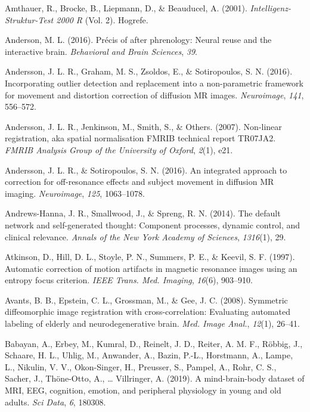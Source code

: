 \documentclass[12pt,american,a4paper,oneside,]{memoir} %
\begin{document}
\leavevmode\hypertarget{ref-Amthauer2001-yg}{}%
Amthauer, R., Brocke, B., Liepmann, D., \& Beauducel, A. (2001). \emph{Intelligenz-Struktur-Test 2000 R} (Vol. 2). Hogrefe.

\leavevmode\hypertarget{ref-anderson2016precis}{}%
Anderson, M. L. (2016). Précis of after phrenology: Neural reuse and the interactive brain. \emph{Behavioral and Brain Sciences}, \emph{39}.

\leavevmode\hypertarget{ref-Andersson2016-nm}{}%
Andersson, J. L. R., Graham, M. S., Zsoldos, E., \& Sotiropoulos, S. N. (2016). Incorporating outlier detection and replacement into a non-parametric framework for movement and distortion correction of diffusion MR images. \emph{Neuroimage}, \emph{141}, 556--572.

\leavevmode\hypertarget{ref-Andersson2007-st}{}%
Andersson, J. L. R., Jenkinson, M., Smith, S., \& Others. (2007). Non-linear registration, aka spatial normalisation FMRIB technical report TR07JA2. \emph{FMRIB Analysis Group of the University of Oxford}, \emph{2}(1), e21.

\leavevmode\hypertarget{ref-Andersson2016-pg}{}%
Andersson, J. L. R., \& Sotiropoulos, S. N. (2016). An integrated approach to correction for off-resonance effects and subject movement in diffusion MR imaging. \emph{Neuroimage}, \emph{125}, 1063--1078.

\leavevmode\hypertarget{ref-andrews2014default}{}%
Andrews-Hanna, J. R., Smallwood, J., \& Spreng, R. N. (2014). The default network and self-generated thought: Component processes, dynamic control, and clinical relevance. \emph{Annals of the New York Academy of Sciences}, \emph{1316}(1), 29.

\leavevmode\hypertarget{ref-Atkinson1997-eu}{}%
Atkinson, D., Hill, D. L., Stoyle, P. N., Summers, P. E., \& Keevil, S. F. (1997). Automatic correction of motion artifacts in magnetic resonance images using an entropy focus criterion. \emph{IEEE Trans. Med. Imaging}, \emph{16}(6), 903--910.

\leavevmode\hypertarget{ref-Avants2008-bv}{}%
Avants, B. B., Epstein, C. L., Grossman, M., \& Gee, J. C. (2008). Symmetric diffeomorphic image registration with cross-correlation: Evaluating automated labeling of elderly and neurodegenerative brain. \emph{Med. Image Anal.}, \emph{12}(1), 26--41.

\leavevmode\hypertarget{ref-Babayan2019-mo}{}%
Babayan, A., Erbey, M., Kumral, D., Reinelt, J. D., Reiter, A. M. F., Röbbig, J., Schaare, H. L., Uhlig, M., Anwander, A., Bazin, P.-L., Horstmann, A., Lampe, L., Nikulin, V. V., Okon-Singer, H., Preusser, S., Pampel, A., Rohr, C. S., Sacher, J., Thöne-Otto, A., \ldots{} Villringer, A. (2019). A mind-brain-body dataset of MRI, EEG, cognition, emotion, and peripheral physiology in young and old adults. \emph{Sci Data}, \emph{6}, 180308.
\end{document}
